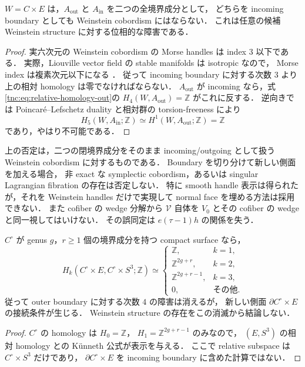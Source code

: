 \begin{corollary}
\label{tnc:no-weinstein-normal-transition}
$W=C\times E$ は，$A_{\mathrm{out}}$ と $A_{\mathrm{in}}$ を二つの全境界成分として，
どちらを incoming boundary としても Weinstein cobordism にはならない．
これは任意の候補 Weinstein structure に対する位相的な障害である．
\end{corollary}

\begin{proof}
実六次元の Weinstein cobordism の Morse handles は index $3$ 以下である．
実際，Liouville vector field の stable manifolds は isotropic なので，
Morse index は複素次元以下になる
\cite[Section~1]{cieliebak-eliashberg-flexible-local}．
従って incoming boundary に対する次数 $3$ より上の相対 homology は零でなければならない．
$A_{\mathrm{out}}$ が incoming なら，式\eqref{tnc:eq:relative-homology-out}の
$H_4(W,A_{\mathrm{out}})=\mathbb Z$ がこれに反する．
逆向きでは Poincar\'e--Lefschetz duality と相対群の torsion-freeness により
\[
 H_5(W,A_{\mathrm{in}};\mathbb Z)
 \simeq H^1(W,A_{\mathrm{out}};\mathbb Z)=\mathbb Z
\]
であり，やはり不可能である．
\end{proof}

\begin{remark}[障害の範囲]
\label{tnc:relative-handles-scope}
上の否定は，二つの閉境界成分をそのまま incoming/outgoing として扱う
Weinstein cobordism に対するものである．
Boundary を切り分けて新しい側面を加える場合，
非 exact な symplectic cobordism，あるいは singular Lagrangian fibration の存在は否定しない．
特に smooth handle 表示は得られたが，それを Weinstein handles だけで実現して
normal face を埋める方法は採用できない．
また cofiber の wedge 分解から $\mathcal V$ 自体を
$V_0$ とその cofiber の wedge と同一視してはいけない．
その誤同定は $e(\tau-1)h$ の関係を失う．
\end{remark}


\begin{corollary}
\label{tnc:punctured-relative-handles}
$C^\circ$ が genus $g$，$r\ge1$ 個の境界成分を持つ compact surface なら，
\[
 H_k(C^\circ\times E,C^\circ\times S^3;\mathbb Z)
 \simeq
 \begin{cases}
  \mathbb Z,&k=1,\\
  \mathbb Z^{2g+r},&k=2,\\
  \mathbb Z^{2g+r-1},&k=3,\\
  0,&\text{その他}.
 \end{cases}
\]
従って outer boundary に対する次数 $4$ の障害は消えるが，
新しい側面 $\partial C^\circ\times E$ の接続条件が生じる．
Weinstein structure の存在をこの消滅から結論しない．
\end{corollary}
\begin{proof}
$C^\circ$ の homology は $H_0=\mathbb Z$，
$H_1=\mathbb Z^{2g+r-1}$ のみなので，
$(E,S^3)$ の相対 homology との K\"unneth 公式が表示を与える．
ここで relative subspace は $C^\circ\times S^3$ だけであり，
$\partial C^\circ\times E$ を incoming boundary に含めた計算ではない．
\end{proof}

